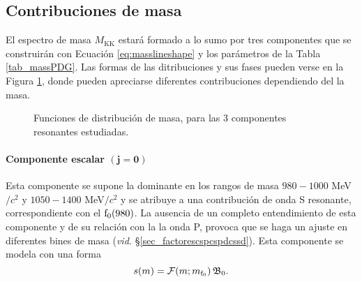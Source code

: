 \subsection{Contribuciones de masa}

El espectro de masa $M_{\text{KK}}$ estará formado a lo sumo por tres componentes que se construirán con Ecuación \ref{eq:masslineshape} y los parámetros de la Tabla \ref{tab_massPDG}. Las formas de las ditribuciones y sus fases pueden verse en la Figura \ref{fig:masslineshape}, donde pueden apreciarse diferentes contribuciones dependiendo del la masa.

\begin{figure}[H]
\centering
{} \hfill
{} \hfill
{} \hfill
{} \hfill
\caption{Funciones de distribución de masa, para las 3 componentes resonantes estudiadas.}  \label{fig:masslineshape}
\end{figure}

\paragraph{Componente escalar $\bm{(j=0)}$}
Esta componente se supone la dominante en los rangos de masa $980- 1000$ MeV$/c^2$ y $1050-1400$ MeV$/c^2$ y se atribuye a una contribución de onda S resonante, correspondiente con el $\text{f}_0(980)$. %
La ausencia de un completo entendimiento de esta componente y de su relación con la la onda P, provoca que se haga un ajuste en diferentes bines de masa (\emph{vid.} \S \ref{sec_factorescspcspdcssd}). Esta componente se modela con una forma 
\begin{equation}
	s(m) = \mathcal{F}(m;m_{\text{f}_0}) \, \mathfrak{B}_0.
\end{equation}


